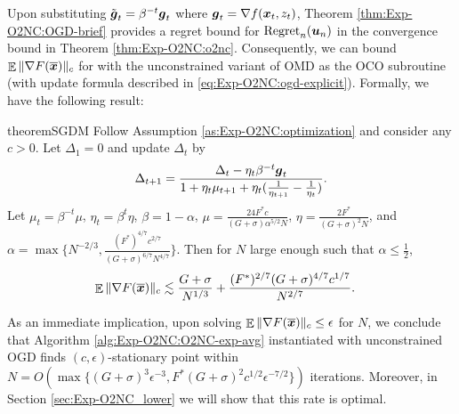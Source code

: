 Upon substituting $\tilde{{\boldsymbol{g}}}_t = \beta^{-t}{\boldsymbol{g}}_t$ where ${\boldsymbol{g}}_t=\nabla f({\boldsymbol{x}}_t,z_t)$, Theorem \ref{thm:Exp-O2NC:OGD-brief} provides a regret bound for $\mathrm{Regret}_n({\boldsymbol{u}}_n)$ in the convergence bound in Theorem \ref{thm:Exp-O2NC:o2nc}. Consequently, we can bound $\mathop{\mathbb{E}}\|\nabla F(\overline{{\boldsymbol{x}}})\|_c$ for \alg with the unconstrained variant of OMD as the OCO subroutine (with update formula described in \eqref{eq:Exp-O2NC:ogd-explicit}). Formally, we have the following result:

\begin{restatable}{theorem}{SGDM}
\label{thm:Exp-O2NC:sgdm}
Follow Assumption \ref{as:Exp-O2NC:optimization} and consider any $c>0$. Let $\Delta_1=0$ and update $\Delta_t$ by
\begin{equation*}
    \Delta_{t+1} = \frac{\Delta_t - \eta_t\beta^{-t}{\boldsymbol{g}}_t}{1+\eta_t\mu_{t+1}+\eta_t(\frac{1}{\eta_{t+1}}-\frac{1}{\eta_t})}.
\end{equation*}
Let $\mu_t=\beta^{-t}\mu$, $\eta_t=\beta^t\eta$, $\beta=1-\alpha$, $\mu=\frac{24F^*c}{(G+\sigma)\alpha^{5/2}N}$, $\eta=\frac{2F^*}{(G+\sigma)^2N}$, and \\
$\alpha=\max\{N^{-2/3}, \frac{(F^*)^{4/7}c^{2/7}}{(G+\sigma)^{6/7}N^{4/7}}\}$. Then for $N$ large enough such that $\alpha \le \frac{1}{2}$,
\begin{align*}
    \mathop{\mathbb{E}}\|\nabla F(\overline{{\boldsymbol{x}}})\|_c
    &\lesssim \frac{G+\sigma}{N^{1/3}} + \frac{(F^*)^{2/7}(G+\sigma)^{4/7}c^{1/7}}{N^{2/7}}.
\end{align*}
\end{restatable}

As an immediate implication, upon solving $\mathop{\mathbb{E}}\|\nabla F(\overline{{\boldsymbol{x}}})\|_c \le \epsilon$ for $N$, we conclude that Algorithm \ref{alg:Exp-O2NC:O2NC-exp-avg} instantiated with unconstrained OGD finds $(c,\epsilon)$-stationary point within $N=O(\max\{(G+\sigma)^3\epsilon^{-3}, F^*(G+\sigma)^2c^{1/2}\epsilon^{-7/2}\})$ iterations. 
Moreover, in Section \ref{sec:Exp-O2NC_lower} we will show that this rate is optimal.

